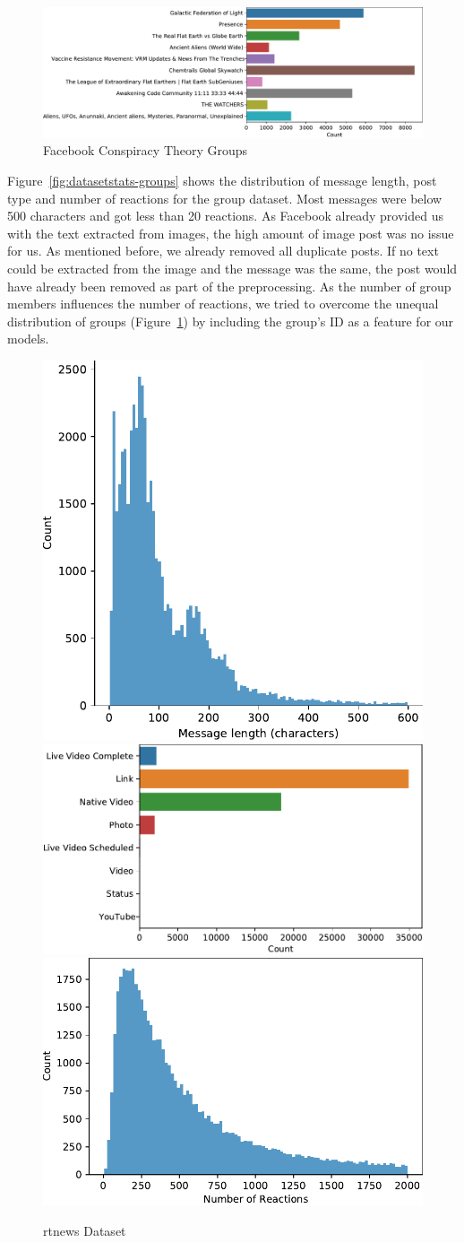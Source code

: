 \begin{figure}[tb] 
    \centering
    \includegraphics[width=\textwidth]{figures/dataset_groups/group_dist.pdf}
    \caption{Facebook Conspiracy Theory Groups}
    \label{fig:dataset-group-names}
\end{figure}
Figure~\ref{fig:datasetstats-groups} shows the distribution of message length, post type 
and number of reactions for the group dataset. Most messages were below 500 characters and
got less than 20 reactions. As Facebook  already provided us with the text extracted from
images, the high amount of image post  was no issue for us. As mentioned before, we
already removed all duplicate posts. If no text could be  extracted from the image and the
message was the same, the post would have already been removed as part of the preprocessing.
As the number of group members influences the number of reactions, we tried to overcome
the unequal distribution of groups (Figure~\ref{fig:dataset-group-names}) by including the
group's ID as a feature for our models. 
\begin{figure}[tb] 
    \centering
    \includegraphics[width=.28\textwidth]{figures/dataset_rtnews/message_length_dist.pdf}
    \includegraphics[width=.40\textwidth]{figures/dataset_rtnews/post_types_dist.pdf}
    \includegraphics[width=.30\textwidth]{figures/dataset_rtnews/reactions_dist.pdf}
    \caption{rtnews Dataset}
    \label{fig:datasetstats-rtnews}
\end{figure} 
